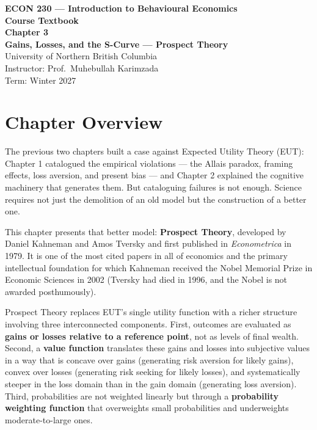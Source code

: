 \documentclass[12pt, letterpaper]{article}
\begin{document}
\begin{titlepage}
\centering\vspace*{3cm}
{\Large\bfseries\color{econblue} ECON 230 --- Introduction to Behavioural Economics\\[1em]}
{\large\bfseries Course Textbook\\[2em]}
{\LARGE\bfseries\color{econblue} Chapter 3\\[0.5em]}
{\Large\bfseries Gains, Losses, and the S-Curve --- Prospect Theory\\[2em]}
\vfill
{\normalsize University of Northern British Columbia\\
Instructor: Prof.\ Muhebullah Karimzada\\
Term: Winter 2027}
\end{titlepage}
\tableofcontents
\newpage


\medskip


\section*{Chapter Overview}


The previous two chapters built a case against Expected Utility Theory (EUT): Chapter 1 catalogued the empirical violations --- the Allais paradox, framing effects, loss aversion, and present bias --- and Chapter 2 explained the cognitive machinery that generates them. But cataloguing failures is not enough. Science requires not just the demolition of an old model but the construction of a better one.

This chapter presents that better model: \textbf{Prospect Theory}, developed by Daniel Kahneman and Amos Tversky and first published in \textit{Econometrica} in 1979. It is one of the most cited papers in all of economics and the primary intellectual foundation for which Kahneman received the Nobel Memorial Prize in Economic Sciences in 2002 (Tversky had died in 1996, and the Nobel is not awarded posthumously).

Prospect Theory replaces EUT's single utility function with a richer structure involving three interconnected components. First, outcomes are evaluated as \textbf{gains or losses relative to a reference point}, not as levels of final wealth. Second, a \textbf{value function} translates these gains and losses into subjective values in a way that is concave over gains (generating risk aversion for likely gains), convex over losses (generating risk seeking for likely losses), and systematically steeper in the loss domain than in the gain domain (generating loss aversion). Third, probabilities are not weighted linearly but through a \textbf{probability weighting function} that overweights small probabilities and underweights moderate-to-large ones.
\end{document}
